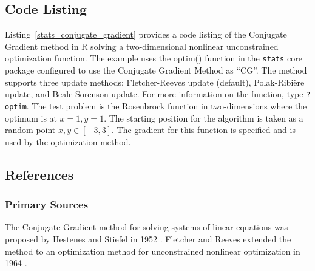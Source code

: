 \subsection{Code Listing}
Listing~\ref{stats_conjugate_gradient} provides a code listing of the Conjugate Gradient method in R solving a two-dimensional nonlinear unconstrained optimization function.
The example uses the {optim()} function in the \texttt{stats} core package configured to use the Conjugate Gradient Method as ``CG''. The method supports three update methods: Fletcher-Reeves update (default), Polak-Ribi\`ere update, and Beale-Sorenson update. For more information on the function, type \texttt{?optim}.
The test problem is the Rosenbrock function in two-dimensions where the optimum is at $x=1, y=1$. The starting position for the algorithm is taken as a random point $x,y \in [-3,3]$. The gradient for this function is specified and is used by the optimization method.





\subsection{References}

\subsubsection{Primary Sources}
The Conjugate Gradient method for solving systems of linear equations was proposed by Hestenes and Stiefel in 1952 \cite{Hestenes1952}.
Fletcher and Reeves extended the method to an optimization method for unconstrained nonlinear optimization in 1964 \cite{Fletcher1964}.

